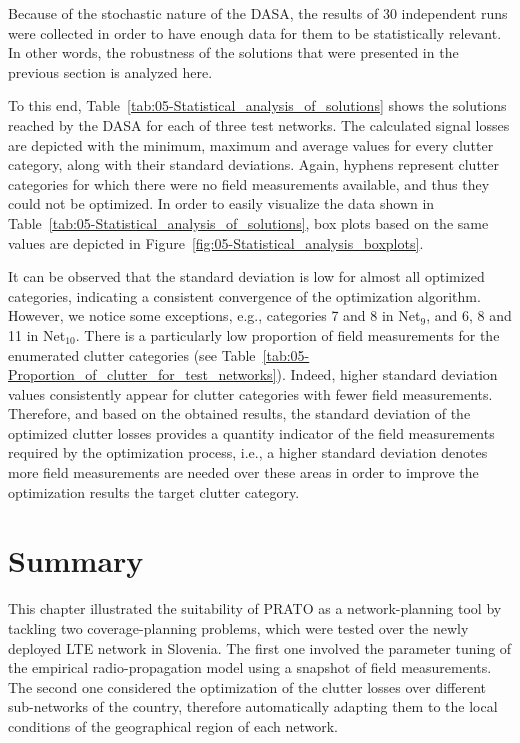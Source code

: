 \bigskip{}


Because of the stochastic nature of the DASA, the results of 30 independent
runs were collected in order to have enough data for them to be statistically
relevant. In other words, the robustness of the solutions that were
presented in the previous section is analyzed here.

To this end, Table~\ref{tab:05-Statistical_analysis_of_solutions}
shows the solutions reached by the DASA for each of three test networks.
The calculated signal losses are depicted with the minimum, maximum
and average values for every clutter category, along with their standard
deviations. Again, hyphens represent clutter categories for which
there were no field measurements available, and thus they could not
be optimized. In order to easily visualize the data shown in Table~\ref{tab:05-Statistical_analysis_of_solutions},
box plots based on the same values are depicted in Figure~\ref{fig:05-Statistical_analysis_boxplots}. 

It can be observed that the standard deviation is low for almost all
optimized categories, indicating a consistent convergence of the optimization
algorithm. However, we notice some exceptions, e.g., categories 7
and 8 in Net$_{9}$, and 6, 8 and 11 in Net$_{10}$. There is a particularly
low proportion of field measurements for the enumerated clutter categories
(see Table\ \ref{tab:05-Proportion_of_clutter_for_test_networks}).
Indeed, higher standard deviation values consistently appear for clutter
categories with fewer field measurements. Therefore, and based on
the obtained results, the standard deviation of the optimized clutter
losses provides a quantity indicator of the field measurements required
by the optimization process, i.e., a higher standard deviation denotes
more field measurements are needed over these areas in order to improve
the optimization results the target clutter category.


\section{Summary}

This chapter illustrated the suitability of PRATO as a network-planning
tool by tackling two coverage-planning problems, which were tested
over the newly deployed LTE network in Slovenia. The first one involved
the parameter tuning of the empirical radio-propagation model using
a snapshot of field measurements. The second one considered the optimization
of the clutter losses over different sub-networks of the country,
therefore automatically adapting them to the local conditions of the
geographical region of each network.

